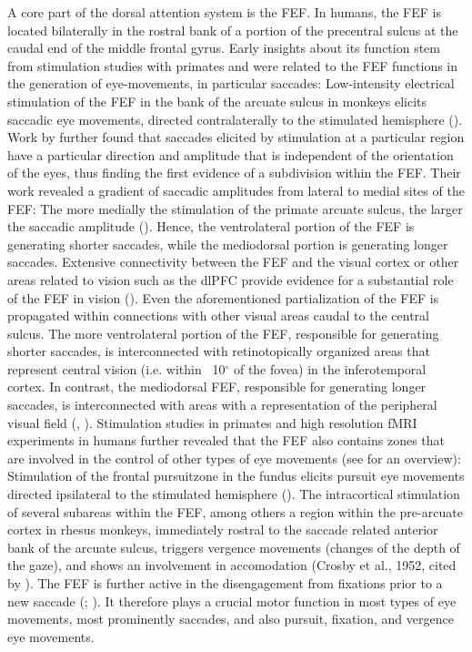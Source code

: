 \documentclass[a4paper, 12pt]{scrreprt}
\begin{document}
A core part of the dorsal attention system is the FEF. In humans, the FEF is located bilaterally in the rostral bank of a portion of the precentral sulcus at the caudal end of the middle frontal gyrus. Early insights about its function stem from stimulation studies with primates and were related to the FEF functions in the generation of eye-movements, in particular saccades: Low-intensity electrical stimulation of the FEF in the bank of the arcuate sulcus in monkeys elicits saccadic eye movements, directed contralaterally to the stimulated hemisphere (\cite{tehovnik2000eye}). Work by \textcite{bruce1985primate} further found that saccades elicited by stimulation at a particular region have a particular direction and amplitude that is independent of the orientation of the eyes, thus finding the first evidence of a subdivision within the FEF. Their work revealed a gradient of saccadic amplitudes from lateral to medial sites of the FEF: The more medially the stimulation of the primate arcuate sulcus, the larger the saccadic amplitude (\cite{bruce1985primate}). Hence, the ventrolateral portion of the FEF is generating shorter saccades, while the mediodorsal portion is generating longer saccades.  Extensive connectivity between the FEF and the visual cortex or other areas related to vision such as the dlPFC provide evidence for a substantial role of the FEF in vision (\cite{stanton1995topography}). Even the aforementioned partialization of the FEF is propagated within connections with other visual areas caudal to the central sulcus. The more ventrolateral portion of the FEF, responsible for generating shorter saccades, is interconnected with retinotopically organized areas that represent central vision (i.e. within ~10$^\circ$ of the fovea) in the inferotemporal cortex. In contrast, the mediodorsal FEF, responsible for generating longer saccades, is interconnected with areas with a representation of the peripheral visual field (\cite{stanton1995topography}, \cite{schall1995topography}).
Stimulation studies in primates and high resolution fMRI experiments in humans further revealed that the FEF also contains zones that are involved in the  control of other types of eye movements (see \textcite{krauzlis2014eye} for an overview): Stimulation of the frontal pursuitzone in the fundus elicits pursuit eye movements directed ipsilateral to the stimulated hemisphere (\cite{blanke2003direction}). The intracortical stimulation of several subareas within the FEF, among others a region within the pre-arcuate cortex in rhesus monkeys, immediately rostral to the saccade related anterior bank of the arcuate sulcus, triggers vergence movements (changes of the depth of the gaze), and shows an involvement in accomodation (Crosby et al., 1952, cited by \textcite{vernet2014corrigendum}). The FEF is further active in the disengagement from fixations prior to a new saccade (\cite{goodwin2007cranial}; \cite{tehovnik2000eye}). It therefore plays a crucial motor function in most types of eye movements, most prominently saccades, and also pursuit, fixation, and vergence eye movements. \newline
\end{document}
